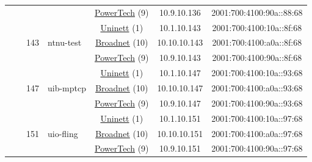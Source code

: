 \begin{small}
\begin{center}
\begin{longtable}{|c|c|c|c|c|c|c|c|}
  &  &  &  & \multicolumn{2}{|c|}{\tiny{\href{http://www.powertech.no}{PowerTech} (9)}} & \tiny{10.9.10.136} & \tiny{2001:700:4100:90a::88:68} \\* \cline{3-3}\cline{4-4}\cline{5-5}\cline{6-6}\cline{7-7}\cline{8-8}
  &  & \multirow{3}{*}{\tiny{143}} & \multicolumn{1}{|l|}{\multirow{3}{*}{\tiny{ntnu-test}}} & \multicolumn{2}{|c|}{\tiny{\href{https://www.uninett.no}{Uninett} (1)}} & \tiny{10.1.10.143} & \tiny{2001:700:4100:10a::8f:68} \\* \cline{5-5}\cline{6-6}\cline{7-7}\cline{8-8}
  &  &  &  & \multicolumn{2}{|c|}{\tiny{\href{https://www.broadnet.no}{Broadnet} (10)}} & \tiny{10.10.10.143} & \tiny{2001:700:4100:a0a::8f:68} \\* \cline{5-5}\cline{6-6}\cline{7-7}\cline{8-8}
  &  &  &  & \multicolumn{2}{|c|}{\tiny{\href{http://www.powertech.no}{PowerTech} (9)}} & \tiny{10.9.10.143} & \tiny{2001:700:4100:90a::8f:68} \\* \cline{3-3}\cline{4-4}\cline{5-5}\cline{6-6}\cline{7-7}\cline{8-8}
  &  & \multirow{3}{*}{\tiny{147}} & \multicolumn{1}{|l|}{\multirow{3}{*}{\tiny{uib-mptcp}}} & \multicolumn{2}{|c|}{\tiny{\href{https://www.uninett.no}{Uninett} (1)}} & \tiny{10.1.10.147} & \tiny{2001:700:4100:10a::93:68} \\* \cline{5-5}\cline{6-6}\cline{7-7}\cline{8-8}
  &  &  &  & \multicolumn{2}{|c|}{\tiny{\href{https://www.broadnet.no}{Broadnet} (10)}} & \tiny{10.10.10.147} & \tiny{2001:700:4100:a0a::93:68} \\* \cline{5-5}\cline{6-6}\cline{7-7}\cline{8-8}
  &  &  &  & \multicolumn{2}{|c|}{\tiny{\href{http://www.powertech.no}{PowerTech} (9)}} & \tiny{10.9.10.147} & \tiny{2001:700:4100:90a::93:68} \\* \cline{3-3}\cline{4-4}\cline{5-5}\cline{6-6}\cline{7-7}\cline{8-8}
  &  & \multirow{3}{*}{\tiny{151}} & \multicolumn{1}{|l|}{\multirow{3}{*}{\tiny{uio-fling}}} & \multicolumn{2}{|c|}{\tiny{\href{https://www.uninett.no}{Uninett} (1)}} & \tiny{10.1.10.151} & \tiny{2001:700:4100:10a::97:68} \\* \cline{5-5}\cline{6-6}\cline{7-7}\cline{8-8}
  &  &  &  & \multicolumn{2}{|c|}{\tiny{\href{https://www.broadnet.no}{Broadnet} (10)}} & \tiny{10.10.10.151} & \tiny{2001:700:4100:a0a::97:68} \\* \cline{5-5}\cline{6-6}\cline{7-7}\cline{8-8}
  &  &  &  & \multicolumn{2}{|c|}{\tiny{\href{http://www.powertech.no}{PowerTech} (9)}} & \tiny{10.9.10.151} & \tiny{2001:700:4100:90a::97:68} \\* \cline{3-3}\cline{4-4}\cline{5-5}\cline{6-6}\cline{7-7}\cline{8-8}

\end{longtable}
\end{center}
\end{small}
